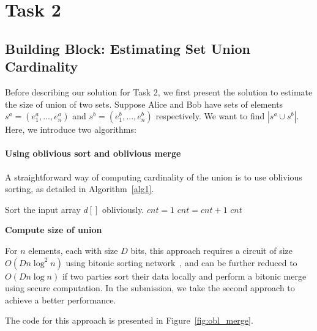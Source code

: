 \section{Task 2}
\subsection{Building Block: Estimating Set Union Cardinality}
Before describing our solution for Task 2, we first present the solution to estimate the size of union of two sets.
Suppose Alice and Bob have sets of elements $s^a = (e^a_1,...,e^a_n)$
and $s^b = (e^b_1,...,e^b_n)$ respectively. We want to find $|s^a\cup s^b|$. Here, we introduce two algorithms:

\paragraph{Using oblivious sort and oblivious merge}
A straightforward way of computing cardinality of the union is to use oblivious sorting, as detailed in Algorithm~\ref{alg1}.

\begin{algorithm}
\begin{algorithmic}[1]
\State Sort the input array $d[]$ obliviously.
\State $cnt = 1$
		\State $cnt = cnt + 1$
	\EndIf
\EndFor
\State\Return $cnt$
\end{algorithmic}
\caption{\textbf{Compute size of union}} %
\label{alg1}
\end{algorithm}
For $n$ elements, each with size $D$ bits, this approach requires a circuit of size $O(Dn\log^2n)$ using bitonic sorting network~\cite{bitonicsort},
and can be further reduced to $O(Dn\log n)$ if two parties sort their data locally and perform a bitonic merge using secure computation.
In the submission, we take the second approach to achieve a better performance.

The code for this approach is presented in Figure~\ref{fig:obl_merge}.

